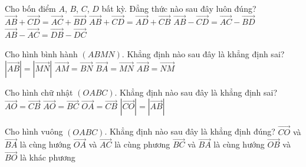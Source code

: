 \begin{ex}
Cho bốn điểm $A$, $B$, $C$, $D$ bất kỳ. Đẳng thức nào sau đây luôn đúng?
\choice
{$\vec{AB} + \vec{CD} = \vec{AC} + \vec{BD}$}
{\True $\vec{AB} + \vec{CD} = \vec{AD} + \vec{CB}$}
{$\vec{AB} - \vec{CD} = \vec{AC} - \vec{BD}$}
{$\vec{AB} - \vec{AC} = \vec{DB} - \vec{DC}$}
\end{ex}

\begin{ex}
Cho hình bình hành $(ABMN)$. Khẳng định nào sau đây là khẳng định sai?
\choice
{$|\overrightarrow{AB}|=|\overrightarrow{MN}|$}
{\True $\overrightarrow{AM}=\overrightarrow{BN}$}
{$\overrightarrow{BA}=\overrightarrow{MN}$}
{$\overrightarrow{AB}=\overrightarrow{NM}$}
\end{ex}

\begin{ex}
Cho hình chữ nhật $(OABC)$. Khẳng định nào sau đây là khẳng định sai?
\choice
{\True $\overrightarrow{AO}=\overrightarrow{CB}$}
{$\overrightarrow{AO}=\overrightarrow{BC}$}
{$\overrightarrow{OA}=\overrightarrow{CB}$}
{$|\overrightarrow{CO}|=|\overrightarrow{AB}|$}
\end{ex}

\begin{ex}
Cho hình vuông $(OABC)$. Khẳng định nào sau đây là khẳng định đúng?
\choice
{\True $\overrightarrow{CO}$ và $\overrightarrow{BA}$ là cùng hướng}
{$\overrightarrow{OA}$ và $\overrightarrow{AC}$ là cùng phương}
{$\overrightarrow{BC}$ và $\overrightarrow{BA}$ là cùng hướng}
{$\overrightarrow{OB}$ và $\overrightarrow{BO}$ là khác phương}
\end{ex}

